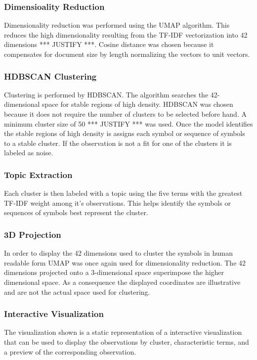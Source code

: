 \documentclass[preprint,12pt]{elsarticle}
\begin{document}
\subsubsection{Dimensioality Reduction}
Dimensionality reduction was performed using the UMAP algorithm. This reduces the high dimensionality resulting from the TF-IDF vectorization into 42 dimensions *** JUSTIFY ***. Cosine distance was chosen because it compensates for document size by length normalizing the vectors to unit vectors. 

\subsubsection{HDBSCAN Clustering}
Clustering is performed by HDBSCAN. The algorithm searches the 42-dimensional space for stable regions of high density. HDBSCAN was chosen because it does not require the number of clusters to be selected before hand. A minimum cluster size of 50 *** JUSTIFY *** was used. Once the model identifies the stable regions of high density is assigns each symbol or sequence of symbols to a stable cluster. If the observation is not a fit for one of the clusters it is labeled as noise. 

\subsubsection{Topic Extraction}
Each cluster is then labeled with a topic using the five terms with the greatest TF-IDF weight among it's observations. This helps identify the symbols or sequences of symbols best represent the cluster. 

\subsubsection{3D Projection}
In order to display the 42 dimensions used to cluster the symbols in human readable form UMAP was once again used for dimensionality reduction. The 42 dimensions projected onto a 3-dimensional space superimpose the higher dimensional space. As a consequence the displayed coordinates are illustrative and are not the actual space used for clustering.

\subsubsection{Interactive Visualization}
The visualization shown is a static representation of a interactive visualization that can be used to display the observations by cluster, characteristic terms, and a preview of the corresponding observation. 
\end{document}
